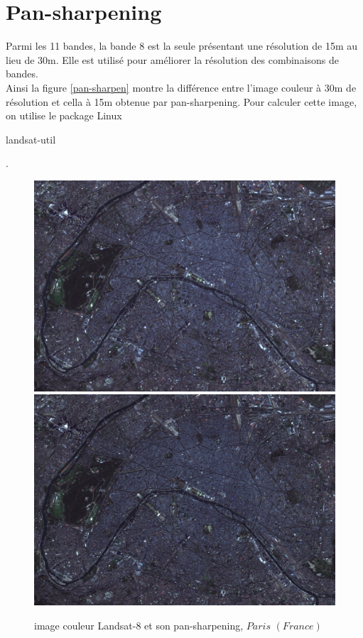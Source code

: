 \documentclass{book}
\begin{document}
\section{Pan-sharpening}

Parmi les 11 bandes, la bande 8 est la seule présentant une résolution de 15m au lieu de 30m. Elle est utilisé pour améliorer la résolution
des combinaisons de bandes.\\
Ainsi la figure \ref{pan-sharpen} montre la différence entre l'image couleur à 30m de résolution et cella à 15m obtenue par pan-sharpening.
Pour calculer cette image, on utilise le package Linux \begin{itshape}landsat-util\end{itshape} \cite{dans-gdal}.

\begin{figure}[H]
\begin{center}
\includegraphics[scale=0.4]{images/paris_rgb_zoom.png}
\includegraphics[scale=0.2]{images/paris_rgb_zoom_pansharpened.png}
\end{center}
\caption{image couleur Landsat-8 et son pan-sharpening, $Paris$ $(France)$}
\label{vegetation}
\end{figure}

\clearpage

\backmatter

\listoftables

\listoffigures



\end{document}

